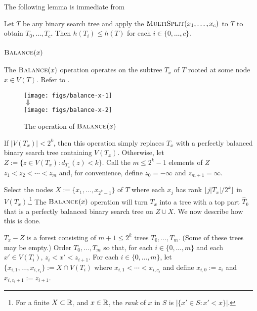\documentclass[kpfonts]{patmorin}
\let\le\leqslant
\begin{document}
The following lemma is immediate from  
\begin{lem}
  Let $T$ be any binary search tree and apply the $\textsc{MultiSplit}(x_1,\ldots,x_c)$ to $T$ to obtain $T_0,\ldots,T_c$.  Then $h(T_i)\le h(T)$ for each $i\in\{0,\ldots,c\}$.
\end{lem}

\subsubsection{$\textsc{Balance}(x)$}

The $\textsc{Balance}(x)$ operation operates on the subtree $T_x$ of $T$ rooted at some node $x\in V(T)$.   Refer to .

\begin{figure}
    \begin{center}
      \texttt{[image: figs/balance-x-1]} \\[-2ex]
      $\Downarrow$ \\[1ex]
      \texttt{[image: figs/balance-x-2]}
    \end{center}  
  \caption{The operation of $\textsc{Balance}(x)$}
\end{figure}

If $|V(T_x)|< 2^k$, then this operation simply replaces $T_x$ with a perfectly balanced binary search tree containing $V(T_x)$.  Otherwise, let $Z:=\{z\in V(T_x): d_{T_x}(z)< k\}$.  Call the $m\le 2^k-1$ elements of $Z$  $z_1<z_2<\cdots<z_{m}$ and, for convenience, define $z_0=-\infty$ and $z_{m+1}=\infty$.

Select the nodes $X:=\{x_1,\ldots,x_{2^k-1}\}$ of $T$ where each $x_j$ has rank $\lfloor j|T_x|/2^k\rfloor$ in $V(T_x)$.\footnote{For a finite $X\subset\mathbb{R}$, and $x\in\mathbb{R}$, the \emph{rank} of $x$ in $S$ is $|\{x'\in S: x'<x\}|$.}  The $\textsc{Balance}(x)$ operation will turn $T_x$ into a tree with a top part $\hat{T}_0$ that is a perfectly balanced binary search tree on $Z\cup X$.  We now describe how this is done.

$T_x-Z$ is a forest consisting of $m+1\le 2^{k}$ trees $T_0,\ldots,T_m$. (Some of these trees may be empty.)  Order $T_{0},\ldots,T_m$ so that, for each $i\in\{0,\ldots,m\}$ and each $x'\in V(T_i)$, $z_i< x' < z_{i+1}$.  For each $i\in\{0,\ldots,m\}$, let $\{x_{i,1},\ldots,x_{i,c_i}\}:=X\cap V(T_i)$ where $x_{i,1}<\cdots<x_{i,c_i}$ and define $x_{i,0}:=z_i$ and $x_{i,c_i+1}:=z_{i+1}$.
\end{document}
